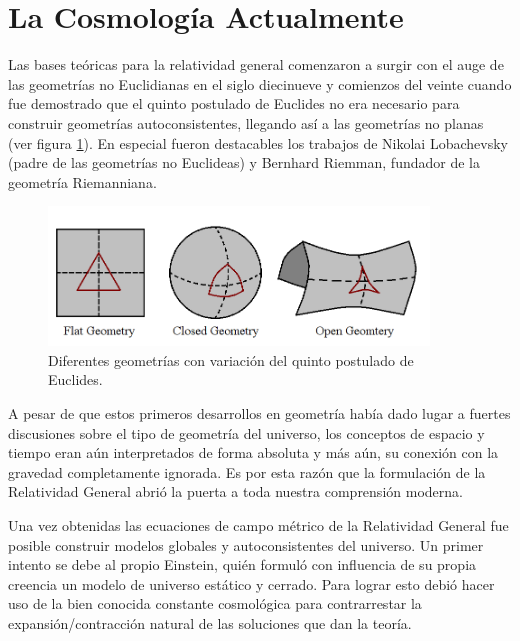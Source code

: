 \section{La Cosmología Actualmente}
\label{sec:TheCurrentCosmologyPicture}


Las bases teóricas para la relatividad general comenzaron a surgir con el 
auge de las geometrías no Euclidianas en el siglo diecinueve y comienzos 
del veinte cuando fue demostrado que el quinto postulado de Euclides no 
era necesario para construir geometrías autoconsistentes, llegando así a las
geometrías no planas (ver figura \ref{fig:NonEuclidean}). En especial fueron 
destacables los trabajos de Nikolai Lobachevsky (padre de las geometrías 
no Euclideas) y Bernhard Riemman, fundador de la geometría Riemanniana.


\begin{figure}[htbp]
	\centering
	\includegraphics[width=0.9\textwidth]{./figures/1_introduction/Non_Euclidean.png}
	
	\caption{\small{Diferentes geometrías con variación del quinto postulado 
	de Euclides.}}
	
	\label{fig:NonEuclidean}
\end{figure}



A pesar de que estos primeros desarrollos en geometría había dado lugar a
fuertes discusiones sobre el tipo de geometría del universo, los conceptos de 
espacio y tiempo eran aún interpretados de forma absoluta y más aún, su 
conexión con la gravedad completamente ignorada. Es por esta razón que 
la formulación de la Relatividad General abrió la puerta a toda nuestra
comprensión moderna.


Una vez obtenidas las ecuaciones de campo métrico de la Relatividad General
fue posible construir modelos globales y autoconsistentes del universo. Un
primer intento se debe al propio Einstein, quién formuló con influencia 
de su propia creencia un modelo de universo estático y cerrado. Para lograr 
esto debió hacer uso de la bien conocida constante cosmológica para 
contrarrestar la expansión/contracción natural de las soluciones que dan 
la teoría.



